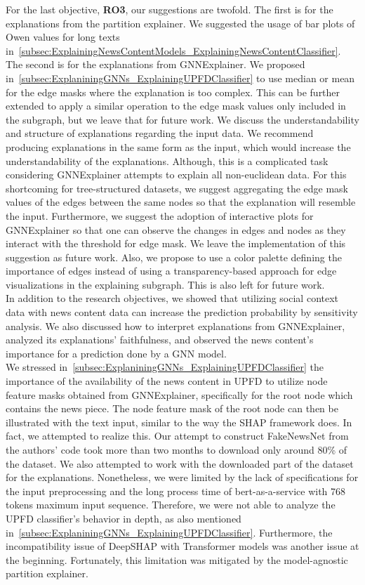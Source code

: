 For the last objective, \textbf{RO3}, our suggestions are twofold. The first is for the explanations from the partition explainer. We suggested the usage of bar plots of Owen values for long texts in~\ref{subsec:ExplainingNewsContentModels_ExplainingNewsContentClassifier}. The second is for the explanations from GNNExplainer. We proposed in~\ref{subsec:ExplaniningGNNs_ExplainingUPFDClassifier} to use median or mean for the edge masks where the explanation is too complex. This can be further extended to apply a similar operation to the edge mask values only included in the subgraph, but we leave that for future work. We discuss the understandability and structure of explanations regarding the input data. We recommend producing explanations in the same form as the input, which would increase the understandability of the explanations. Although, this is a complicated task considering GNNExplainer attempts to explain all non-euclidean data. For this shortcoming for tree-structured datasets, we suggest aggregating the edge mask values of the edges between the same nodes so that the explanation will resemble the input. Furthermore, we suggest the adoption of interactive plots for GNNExplainer so that one can observe the changes in edges and nodes as they interact with the threshold for edge mask. We leave the implementation of this suggestion as future work. Also, we propose to use a color palette defining the importance of edges instead of using a transparency-based approach for edge visualizations in the explaining subgraph. This is also left for future work.\\
In addition to the research objectives, we showed that utilizing social context data with news content data can increase the prediction probability by sensitivity analysis. We also discussed how to interpret explanations from GNNExplainer, analyzed its explanations' faithfulness, and observed the news content's importance for a prediction done by a GNN model.\\
We stressed in~\ref{subsec:ExplaniningGNNs_ExplainingUPFDClassifier} the importance of the availability of the news content in UPFD to utilize node feature masks obtained from GNNExplainer, specifically for the root node which contains the news piece. The node feature mask of the root node can then be illustrated with the text input, similar to the way the SHAP framework does. In fact, we attempted to realize this. Our attempt to construct FakeNewsNet from the authors' code took more than two months to download only around 80\% of the dataset. We also attempted to work with the downloaded part of the dataset for the explanations. Nonetheless, we were limited by the lack of specifications for the input preprocessing and the long process time of bert-as-a-service with 768 tokens maximum input sequence. Therefore, we were not able to analyze the UPFD classifier's behavior in depth, as also mentioned in~\ref{subsec:ExplaniningGNNs_ExplainingUPFDClassifier}. Furthermore, the incompatibility issue of DeepSHAP with Transformer models was another issue at the beginning. Fortunately, this limitation was mitigated by the model-agnostic partition explainer.\\
